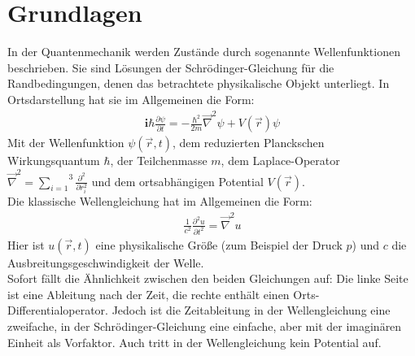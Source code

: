 \documentclass[numbers=noenddot,12pt,a4paper]{scrartcl}
\newcommand{\imag}{\mathbf{i}}
\begin{document}
\section{Grundlagen}
In der Quantenmechanik werden Zustände durch sogenannte Wellenfunktionen beschrieben. Sie sind Lösungen der Schrödinger-Gleichung für die Randbedingungen, denen das betrachtete physikalische Objekt unterliegt. In Ortsdarstellung hat sie im Allgemeinen die Form:
\begin{align}
\imag\hbar\frac{\partial\psi}{\partial t}=-\frac{\hbar^2}{2m}\vec{\nabla}^2 \psi+V(\vec{r})\psi\label{eq:schro}
\end{align}
Mit der Wellenfunktion $\psi(\vec{r},t)$, dem reduzierten Planckschen Wirkungsquantum $\hbar$, der Teilchenmasse $m$, dem Laplace-Operator $\vec{\nabla}^2=\overset{3}{\underset{i=1}{\sum}}\frac{\partial^2}{\partial r_i^2}$ und dem ortsabhängigen Potential $V(\vec{r})$.\\
Die klassische Wellengleichung hat im Allgemeinen die Form:
\begin{align}
\frac{1}{c^2}\frac{\partial^2 u}{\partial t^2}=\vec{\nabla}^2 u
\end{align}
Hier ist $u(\vec{r},t)$ eine physikalische Größe (zum Beispiel der Druck $p$) und $c$ die Ausbreitungsgeschwindigkeit der Welle.\\
Sofort fällt die Ähnlichkeit zwischen den beiden Gleichungen auf: Die linke Seite ist eine Ableitung nach der Zeit, die rechte enthält einen Orts-Differentialoperator. Jedoch ist die Zeitableitung in der Wellengleichung eine zweifache, in der Schrödinger-Gleichung eine einfache, aber mit der imaginären Einheit als Vorfaktor. Auch tritt in der Wellengleichung kein Potential auf.
\end{document}
